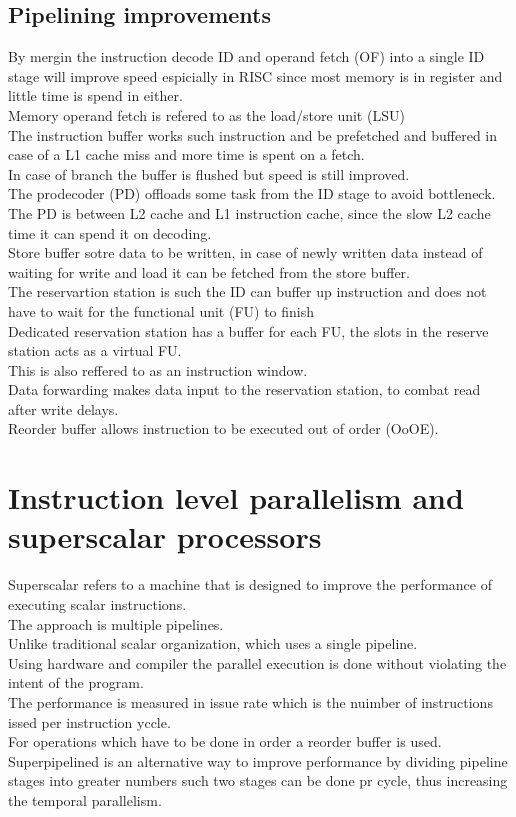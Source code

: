 \documentclass[12pt, a4paper]{article}
\begin{document}
		\subsection{Pipelining improvements}
			By mergin the instruction decode ID and operand fetch (OF) into a single ID stage will improve speed espicially in RISC since most memory is in register and little time is spend in either.\\
			Memory operand fetch is refered to as the load/store unit (LSU)\\
			The instruction buffer works such instruction and be prefetched and buffered in case of a L1 cache miss and more time is spent on a fetch.\\
			In case of branch the buffer is flushed but speed is still improved.\\
			The prodecoder (PD) offloads some task from the ID stage to avoid bottleneck.\\
			The PD is between L2 cache and L1 instruction cache, since the slow L2 cache time it can spend it on decoding.\\
			Store buffer sotre data to be written, in case of newly written data instead of waiting for write and load it can be fetched from the store buffer.\\
			The reservartion station is such the ID can buffer up instruction and does not have to wait for the functional unit (FU) to finish\\
			Dedicated reservation station has a buffer for each FU, the slots in the reserve station acts as a virtual FU.\\
			This is also reffered to as an instruction window.\\
			Data forwarding makes data input to the reservation station, to combat read after write delays.\\
			Reorder buffer allows instruction to be executed out of order (OoOE).
	\section{Instruction level parallelism and superscalar processors}
		Superscalar refers to a machine that is designed to improve the performance of executing scalar instructions.\\
		The approach is multiple pipelines.\\
		Unlike traditional scalar organization, which uses a single pipeline.\\
		Using hardware and compiler the parallel execution is done without violating the intent of the program.\\
		The performance is measured in issue rate which is the nuimber of instructions issed per instruction yccle.\\
		For operations which have to be done in order a reorder buffer is used.\\
		Superpipelined is an alternative way to improve performance by dividing pipeline stages into greater numbers such two stages can be done pr cycle, thus increasing the temporal parallelism.\\
\end{document}
